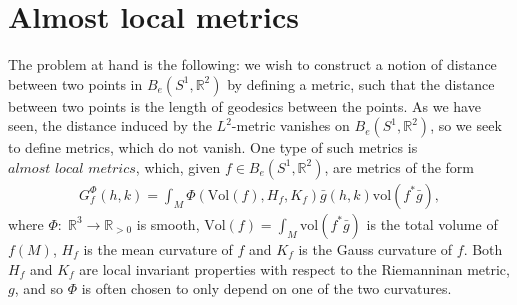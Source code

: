\documentclass[a4,danish]{article}
\theoremstyle{break}
\theoremstyle{definition}
\theoremstyle{Break}
\newcommand{\R}{\mathbb{R}}
\begin{document}

\section*{Almost local metrics}
\label{sec:al-metrics}

The problem at hand is the following: we wish to construct a notion of distance between two points in $B_e(S^1,\R^2)$ by defining a metric, such that the distance between two points is the length of geodesics between the points. As we have seen, the distance induced by the $L^2$-metric vanishes on $B_e(S^1, \R^2)$, so we seek to define metrics, which do not vanish. One type of such metrics is $\textit{almost local metrics}$, which, given $f \in B_e(S^1, \R^2)$, are metrics of the form
\begin{align*}
G_f^\Phi (h,k) = \int_M \Phi(\text{Vol}(f), H_f, K_f) \bar{g}(h,k) \text{vol}(f^* \bar{g}),
\end{align*}
where $\Phi: \; \R^3 \rightarrow \R_{> 0}$ is smooth, $\text{Vol}(f) = \int_M \text{vol}(f^* \bar{g})$  is the total volume of $f(M)$, $H_f$ is the mean curvature of $f$ and $K_f$ is the Gauss curvature of $f$. Both $H_f$ and $K_f$ are local invariant properties with respect to the Riemanninan metric, $g$, and so $\Phi$ is often chosen to only depend on one of the two curvatures. 
\end{document}
